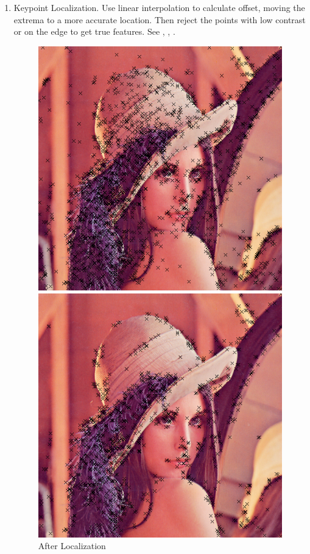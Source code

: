 \begin{enumerate}
  \item Keypoint Localization.
    Use linear interpolation to calculate offset,
    moving the extrema to a more accurate location.
    Then reject the points with low contrast or on the edge to get true features.
    See , , .
    \begin{figure}[H]
      \begin{minipage}[b]{0.46\linewidth}
        \centering
        \includegraphics[scale=0.4]{res/feature_after_offset.png}
        \caption{After Localization \label{fig:feature1}}
      \end{minipage}
      \hspace{1em}
      \begin{minipage}[b]{0.46\linewidth}
        \centering
        \includegraphics[scale=0.4]{res/feature_after_contrast.png}

\end{minipage}
\end{figure}
\end{enumerate}
